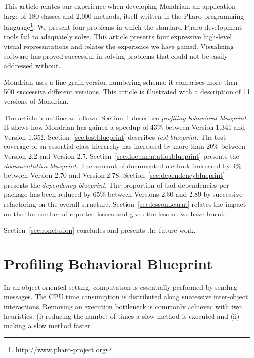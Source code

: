 \documentclass[runningheads]{llncs}
\newcommand{\seclabel}[1]{\label{sec:#1}}
\newcommand{\secref}[1]{Section~\ref{sec:#1}}
\begin{document}
This article relates our experience when developing Mondrian, an application large of 180 classes and 2,000 methods, itself written in the Pharo programming language\footnote{\url{http://www.pharo-project.org}}. We present four problems in which the standard Pharo development tools fail to adequately solve. This article presents four expressive high-level visual representations and relates the experience we have gained. Visualizing software has proved successful in solving problems that could not be easily addressed without.

Mondrian uses a fine grain version numbering schema: it comprises more than 500 successive different versions. This article is illustrated with a description of 11 versions of Mondrian.

The article is outline as follows.
\secref{profilingblueprint} describes \emph{profiling behavioral blueprint}. It shows how Mondrian has gained a speedup of 43\% between Version 1.341 and Version 1.352.
\secref{testblueprint} describes \emph{test blueprint}. The test coverage of an essential class hierarchy has increased by more than 20\% between Version 2.2 and Version 2.7.
\secref{documentationblueprint} presents the \emph{documentation blueprint}. The amount of documented methods increased by 9\% between Version 2.70 and Version 2.78. 
\secref{dependencyblueprint} presents the \emph{dependency blueprint}. The proportion of bad dependencies per package has been reduced by 65\% between Versions 2.80 and 2.89 by successive refactoring on the overall structure.
\secref{lessonLearnt} relates the impact on the the number of reported issues and gives the lessons we have learnt.

\secref{conclusion} concludes and presents the future work.



\section{Profiling Behavioral Blueprint}\seclabel{profilingblueprint}

In an object-oriented setting, computation is essentially performed by sending messages. The CPU time consumption is distributed along successive inter-object interactions. Removing an execution bottleneck is commonly achieved with two heuristics: (i) reducing the number of times a slow method is executed and (ii) making a slow method faster.
\end{document}
